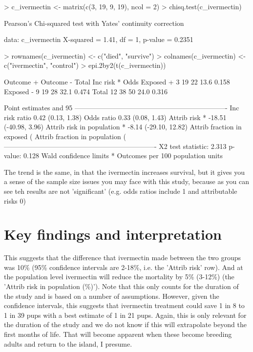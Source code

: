 \documentclass{article}
\begin{document}
\begin{Schunk}
\begin{Sinput}
> c_ivermectin <- matrix(c(3, 19, 9, 19), ncol = 2)
> chisq.test(c_ivermectin)
\end{Sinput}
\begin{Soutput}
	Pearson's Chi-squared test with Yates' continuity correction

data:  c_ivermectin
X-squared = 1.41, df = 1, p-value = 0.2351
\end{Soutput}
\begin{Sinput}
> rownames(c_ivermectin) <- c("died", "survive")
> colnames(c_ivermectin) <- c("ivermectin", "control")
> epi.2by2(t(c_ivermectin))
\end{Sinput}
\begin{Soutput}
             Outcome +    Outcome -      Total        Inc risk *        Odds
Exposed +            3           19         22              13.6       0.158
Exposed -            9           19         28              32.1       0.474
Total               12           38         50              24.0       0.316

Point estimates and 95 %
-------------------------------------------------------------------
Inc risk ratio                               0.42 (0.13, 1.38)
Odds ratio                                   0.33 (0.08, 1.43)
Attrib risk *                                -18.51 (-40.98, 3.96)
Attrib risk in population *                  -8.14 (-29.10, 12.82)
Attrib fraction in exposed (%
Attrib fraction in population (%
-------------------------------------------------------------------
 X2 test statistic: 2.313 p-value: 0.128
 Wald confidence limits
 * Outcomes per 100 population units 
\end{Soutput}
\end{Schunk}

The trend is the same, in that the ivermectin increases survival, but it gives you a sense of the sample size issues you may face with this study, because as you can see teh results are not 'significant' (e.g. odds ratios include 1 and attributable risks 0)

\section{Key findings and interpretation}

This suggests that the difference that ivermectin made between the two groups was 10\% (95\% confidence intervals are 2-18\%, i.e. the 'Attrib risk' row). And at the population level ivermectin will reduce the mortality by 5\% (3-12\%) (the 'Attrib risk in population (\%)'). Note that this only counts for the duration of the study and is based on a number of assumptions. However, given the confidence intervals, this suggests that ivermectin treatment could save 1 in 8 to 1 in 39 pups with a best estimate of 1 in 21 pups. Again, this is only relevant for the duration of the study and we do not know if this will extrapolate beyond the first months of life. That will become apparent when these become breeding adults and return to the island, I presume.
\end{document}
